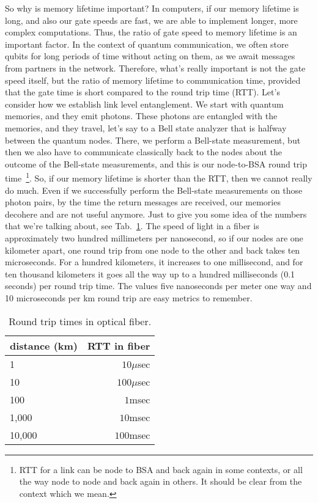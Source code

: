So why is memory lifetime important? In computers, if our memory lifetime is long, and also our gate speeds are fast, we are able to implement longer, more complex computations.  Thus, the ratio of gate speed to memory lifetime is an important factor. In the context of quantum communication, we often store qubits for long periods of time without acting on them, as we await messages from partners in the network.  Therefore, what's really important is not the gate speed itself, but the ratio of memory lifetime to communication time, 
provided that the gate time is short compared to the round trip time (RTT). Let's consider how we establish link level entanglement. We start with quantum memories, and they emit photons. These photons are entangled with the memories, and they travel, let's say to a Bell state analyzer that is halfway between the quantum nodes. There, we perform a Bell-state measurement, but then we also have to communicate classically back to the nodes about the outcome of the Bell-state measurements, and this is our node-to-BSA round trip time~\footnote{RTT for a link can be node to BSA and back again in some contexts, or all the way node to node and back again in others. It should be clear from the context which we mean.}. So, if our memory lifetime is shorter than the RTT, then we cannot really do much. Even if we successfully perform the Bell-state measurements on those photon pairs, by the time the return messages are received, our memories decohere and are not useful anymore. Just to give you some idea of the numbers that we're talking about, see Tab.~\ref{tab:rtt}. The speed of light in a fiber is approximately two hundred millimeters per nanosecond, so if our nodes are one kilometer apart, one round trip from one node to the other and back takes ten microseconds. For a hundred kilometers, it increases to one millisecond, and for ten thousand kilometers it goes all the way up to a hundred milliseconds (0.1 seconds) per round trip time.  The values five nanoseconds per meter one way and 10 microseconds per km round trip are easy metrics to remember.

\begin{table}
\begin{tabular}{l|r}
distance (km)  & RTT in fiber \\\hline
1     & $10\mu$sec \\
10    & $100\mu$sec \\
100   & $1$msec \\
1,000 & $10$msec \\
10,000 & $100$msec
\end{tabular}
\caption{Round trip times in optical fiber.}
\label{tab:rtt}
\end{table}

